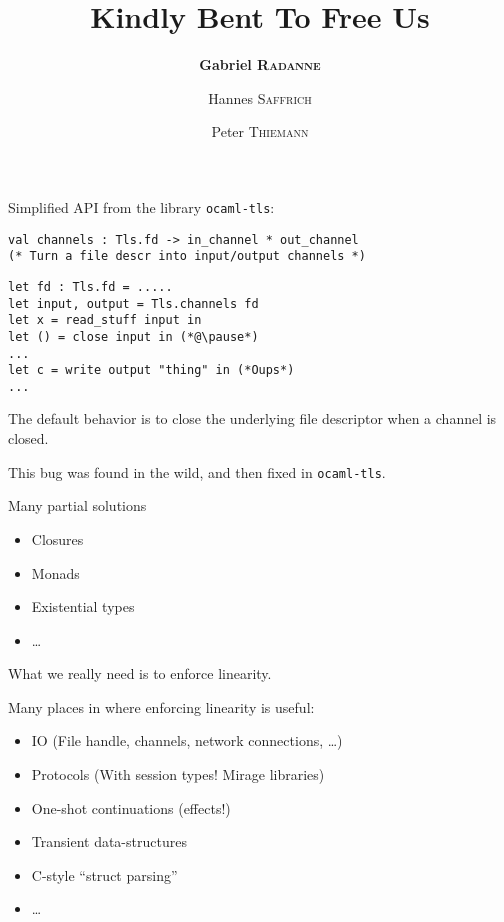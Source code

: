\documentclass[xcolor=svgnames,11pt]{beamer}
\title{Kindly Bent To Free Us}
\author{\textbf{Gabriel \textsc{Radanne}}
  \and Hannes \textsc{Saffrich}
  \and Peter \textsc{Thiemann}}
\begin{document}
\frame[plain]{\titlepage}

\begin{frame}[fragile]

Simplified API from the library \texttt{ocaml-tls}:
  
\begin{lstlisting}
val channels : Tls.fd -> in_channel * out_channel
(* Turn a file descr into input/output channels *)
\end{lstlisting}\pause
\begin{lstlisting}
let fd : Tls.fd = .....
let input, output = Tls.channels fd
let x = read_stuff input in
let () = close input in (*@\pause*)
...
let c = write output "thing" in (*Oups*)
...
\end{lstlisting}
  \pause

  The default behavior is to close the underlying file descriptor when a channel is closed.

  This bug was found in the wild, and then fixed in \texttt{ocaml-tls}.
\end{frame}

\begin{frame}
  Many partial solutions
  \begin{itemize}
  \item Closures
  \item Monads
  \item Existential types
  \item \dots
  \end{itemize}
  \pause

  What we really need is to enforce linearity.
\end{frame}

\begin{frame}
  Many places in \ocaml where enforcing linearity is useful:
  \begin{itemize}
  \item IO (File handle, channels, network connections, \dots)
  \item Protocols (With session types! Mirage libraries)
  \item One-shot continuations (effects!)
  \item Transient data-structures
  \item C-style ``struct parsing''
  \item \dots
  \end{itemize}
\end{frame}
\end{document}
